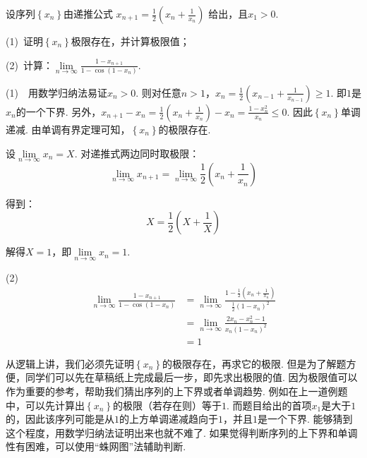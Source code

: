 \begin{example}
\label{ex:ch01-23}
设序列$\left\{ x_{n} \right\}$由递推公式
$x_{n+1}=\displaystyle\frac{1}{2}\left( x_{n}+\displaystyle\frac{1}{x_{n}} \right)$
给出，且$x_{1}>0$. \par
(1)~证明$\left\{ x_{n} \right\}$极限存在，并计算极限值；

(2)~计算：$\lim\limits_{n \to \infty}\displaystyle\frac{1-x_{n+1}}{1-\cos(1-x_{n})}$.
\end{example}

\begin{solution}
(1)~~用数学归纳法易证$x_{n}>0$. 则对任意$n>1$，$x_{n}=\displaystyle\frac{1}{2}\left( x_{n-1}+\displaystyle\frac{1}{x_{n-1}} \right) \ge 1$. 即$1$是$x_{n}$的一个下界. 另外，$x_{n+1}-x_{n}= \displaystyle\frac{1}{2}\left( x_{n}+\displaystyle\frac{1}{x_{n}} \right)-x_{n}
=\displaystyle\frac{1-x_{n}^{2}}{x_{n}} \le 0$. 因此$\left\{ x_{n}\right\}$单调递减. 由单调有界定理可知，$\left\{ x_{n}\right\}$的极限存在.\par
设$\lim\limits_{n \to \infty}x_{n}=X$. 对递推式两边同时取极限：
$$
\lim\limits_{n \to \infty}x_{n+1}= \lim\limits_{n \to \infty}\displaystyle\frac{1}{2}\left( x_{n}+\displaystyle\frac{1}{x_{n}} \right)
$$

得到：
$$
X = \frac{1}{2}\left( X+\frac{1}{X} \right)
$$

解得$X=1$，即$\lim\limits_{n \to \infty}x_{n}=1$.

(2)
\begin{equation}
    \begin{aligned}
        \lim\limits_{n \to \infty}\displaystyle\frac{1-x_{n+1}}{1-\cos(1-x_{n})}
        &= \lim\limits_{n \to \infty}\displaystyle\frac{1-\frac{1}{2}\left( x_{n}+\frac{1}{x_{n}} \right)}{\frac{1}{2}(1-x_{n})^{2}}\\
        &= \lim\limits_{n \to \infty}\displaystyle\frac{2x_{n}-x_{n}^{2}-1}{x_{n}(1-x_{n})^2}\\
        &= 1
        \nonumber
    \end{aligned}
\end{equation}
\end{solution}

从逻辑上讲，我们必须先证明$\left\{ x_{n}\right\}$的极限存在，再求它的极限. 但是为了解题方便，同学们可以先在草稿纸上完成最后一步，即先求出极限的值.
因为极限值可以作为重要的参考，帮助我们猜出序列的上下界或者单调趋势. 例如在上一道例题中，可以先计算出$\left\{ x_{n}\right\}$的极限（若存在则）等于$1$.
而题目给出的首项$x_{1}$是大于$1$的，因此该序列可能是从$1$的上方单调递减趋向于$1$，并且$1$是一个下界. 能够猜到这个程度，用数学归纳法证明出来也就不难了.
如果觉得判断序列的上下界和单调性有困难，可以使用“蛛网图”法辅助判断.

